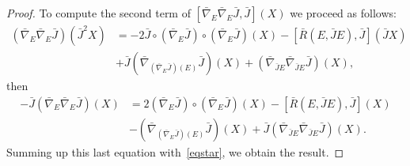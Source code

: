 \documentclass[10pt,a4paper]{amsart}
\begin{document}
\begin{proof}
To compute the second term of $[\bar{\nabla}_E\bar{\nabla}_E \bar{J} ,
\bar{J}] (X)$ we proceed as follows: 
\begin{align*} 
(\bar{\nabla}_E \bar{\nabla}_E \bar{J})(\bar{J}^2X)&=-2\bar{J}\circ(\bar{\nabla}_{E}\bar{J})\circ(\bar{\nabla}_{E}\bar{J})(X)-[\bar{R}(E,\bar{J}E),\bar{J}](\bar{J}X)\\
&+\bar{J}(\bar{\nabla}_{(\bar{\nabla}_E\bar{J})(E)}\bar{J})(X)+(\bar{\nabla}_{\bar{J}E}\bar{\nabla}_{\bar{J}E}\bar{J}) (X),
\end{align*}
then
\begin{align*} 
-\bar{J}(\bar{\nabla}_E \bar{\nabla}_E \bar{J})(X)&=2(\bar{\nabla}_{E}\bar{J})\circ(\bar{\nabla}_{E}\bar{J})(X)-[\bar{R}(E,\bar{J}E),\bar{J}](X)\\
&-(\bar{\nabla}_{(\bar{\nabla}_E\bar{J})(E)}\bar{J})(X)+\bar{J}(\bar{\nabla}_{\bar{J}E}\bar{\nabla}_{\bar{J}E}\bar{J}) (X).
\end{align*}
Summing up this last equation with~\eqref{eqstar}, we obtain the result.
\end{proof}
\end{document}
